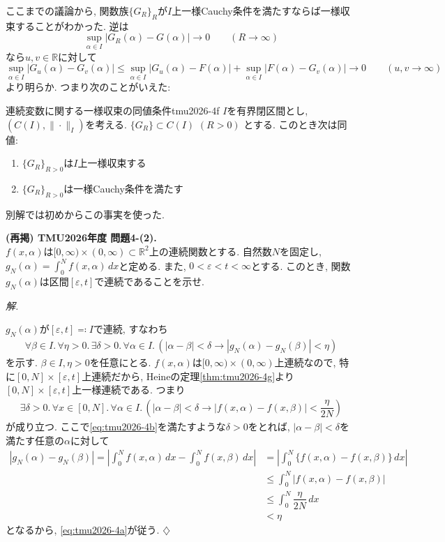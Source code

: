 \documentclass[titlepage]{jsarticle}
\numberwithin{equation}{section}
\newcommand{\R}{\mathbb{R}}%
\newenvironment{kaitou}[1][解]{%
\begin{proofbox}%
\textit{#1. }\ignorespaces
}{%
\hfill$\diamondsuit$%
\end{proofbox}%
}
\begin{document}
ここまでの議論から, 関数族$\{G_R\}_R$が$I$上一様Cauchy条件を満たすならば一様収束することがわかった. 逆は
\[
\sup_{\alpha \in I} |G_R(\alpha) - G(\alpha)| \to 0\qquad(R \to \infty)
\]
なら$u, v \in \R$に対して
\[
\sup_{\alpha \in I} |G_u(\alpha) - G_v(\alpha)| \le \sup_{\alpha \in I} |G_u(\alpha)  - F(\alpha)| +\sup_{\alpha \in I} |F(\alpha) - G_v(\alpha)| \to 0\qquad(u,v \to \infty)
\]
より明らか. つまり次のことがいえた:
\begin{thm}{連続変数に関する一様収束の同値条件}{tmu2026-4f}
$I$を有界閉区間とし, $(C(I), \|\cdot\|_I)$を考える.
$\{G_R\}\subset C(I)$ $(R>0)$ とする. このとき次は同値:
\begin{enumerate}
\item[(i)] $\{G_R\}_{R>0}$は$I$上一様収束する
\item[(ii)] $\{G_R\}_{R>0}$は一様Cauchy条件を満たす
\end{enumerate}
\end{thm}
別解では初めからこの事実を使った.
\begin{problem}
\textbf{(再掲) TMU2026年度 問題4-(2).}\\
$f(x, \alpha)$は$[0, \infty) \times (0, \infty) \subset\R^2$上の連続関数とする. 自然数$N$を固定し, $\displaystyle{g_N(\alpha) = \int_0^N f(x, \alpha)\,dx}$と定める. また, $0 < \varepsilon < t < \infty$とする. このとき, 関数$g_N(\alpha)$は区間$[\varepsilon, t]$で連続であることを示せ.
\end{problem}
\begin{kaitou}
$g_N(\alpha)$が$[\varepsilon, t] \eqqcolon I$で連続, すなわち
\begin{align}
\forall \beta \in I.\, \forall \eta > 0.\, \exists \delta > 0.\,\forall \alpha \in I.\,\left(|\alpha - \beta| < \delta \to |g_N(\alpha) - g_N(\beta)| < \eta \right) \label{eq:tmu2026-4a}
\end{align}
を示す. $\beta \in I, \eta > 0$を任意にとる. $f(x, \alpha)$は$[0, \infty) \times (0, \infty)$上連続なので, 特に$[0, N] \times [\varepsilon, t]$上連続だから, Heineの定理\ref{thm:tmu2026-4g}より$[0, N] \times [\varepsilon, t]$上一様連続である. つまり
\begin{align}
\exists \delta > 0.\,\forall x \in [0, N].\,\forall \alpha \in I.\,\left(|\alpha - \beta| < \delta \to |f(x, \alpha) - f(x, \beta)| < \dfrac{\eta}{2N}\right) \label{eq:tmu2026-4b}
\end{align}
が成り立つ. ここで\eqref{eq:tmu2026-4b}を満たすような$\delta > 0$をとれば, $|\alpha - \beta| < \delta$を満たす任意の$\alpha$に対して
\begin{align*}
|g_N (\alpha) - g_N(\beta)| = \left|\int_0^N f(x, \alpha)\,dx - \int_0^N f(x, \beta)\, dx\right|   &= \left|\int_0^N \{f(x, \alpha) - f(x, \beta)\} \, dx \right|\\
 &\le \int_0^N \left|f(x, \alpha) - f(x, \beta)\right|\\
 &\le \int_0^N \dfrac{\eta}{2N}\,dx \\
 & < \eta
\end{align*}
となるから, \eqref{eq:tmu2026-4a}が従う.
\end{kaitou}
\end{document}
